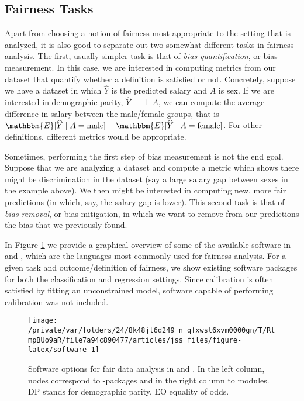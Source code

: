 \documentclass[
  nojss]{jss}
\begin{document}
\hypertarget{fairness-tasks}{%
\subsection{Fairness Tasks}\label{fairness-tasks}}

Apart from choosing a notion of fairness most appropriate to the setting
that is analyzed, it is also good to separate out two somewhat different
tasks in fairness analysis. The first, usually simpler task is that of
\emph{bias quantification}, or bias measurement. In this case, we are
interested in computing metrics from our dataset that quantify whether a
definition is satisfied or not. Concretely, suppose we have a dataset in
which \(\widehat{Y}\) is the predicted salary and \(A\) is sex. If we
are interested in demographic parity,
\(\widehat{Y} {\perp\!\!\!\perp}A\), we can compute the average
difference in salary between the male/female groups, that is
\(\mathbbm{E}[\widehat{Y} \mid A = \text{male}] - \mathbbm{E}[\widehat{Y} \mid A = \text{female}]\).
For other definitions, different metrics would be appropriate.

Sometimes, performing the first step of bias measurement is not the end
goal. Suppose that we are analyzing a dataset and compute a metric which
shows there might be discrimination in the dataset (say a large salary
gap between sexes in the example above). We then might be interested in
computing new, more fair predictions (in which, say, the salary gap is
lower). This second task is that of \emph{bias removal}, or bias
mitigation, in which we want to remove from our predictions the bias
that we previously found.

In Figure \ref{fig:software} we provide a graphical overview of some of
the available software in  and , which are
the languages most commonly used for fairness analysis. For a given task
and outcome/definition of fairness, we show existing software packages
for both the classification and regression settings. Since calibration
is often satisfied by fitting an unconstrained model, software capable
of performing calibration was not included.

\begin{CodeChunk}
\begin{figure}

{\centering \texttt{[image: /private/var/folders/24/8k48jl6d249\_n\_qfxwsl6xvm0000gn/T/RtmpBUo9aR/file7a94c890477/articles/jss\_files/figure-latex/software-1]} 

}

\caption{Software options for fair data analysis in  and . In the left column, nodes correspond to -packages and in the right column to  modules. DP stands for demographic parity, EO equality of odds.}\label{fig:software}
\end{figure}
\end{CodeChunk}
\end{document}
